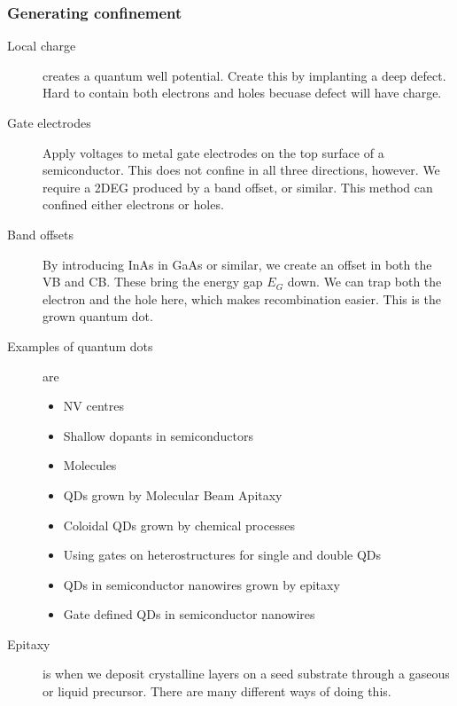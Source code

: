\subsubsection{Generating confinement}
\begin{description}
\item[Local charge] creates a quantum well potential. Create this by implanting a deep defect. Hard to contain both electrons and holes becuase defect will have charge. 

\item[Gate electrodes] Apply voltages to metal gate electrodes on the top surface of a semiconductor. This does not confine in all three directions, however. We require a 2DEG produced by a band offset, or similar. This method can confined either electrons or holes. 

\item[Band offsets] By introducing InAs in GaAs or similar, we create an offset in both the VB and CB. These bring the energy gap $E_G$ down. We can trap both the electron and the hole here, which makes recombination easier. This is the grown quantum dot. 

\item[Examples of quantum dots] are
\begin{itemize}
\item NV centres
\item Shallow dopants in semiconductors
\item Molecules
\item QDs grown by Molecular Beam Apitaxy
\item Coloidal QDs grown by chemical processes
\item Using gates on heterostructures for single and double QDs
\item QDs in semiconductor nanowires grown by epitaxy
\item Gate defined QDs in semiconductor nanowires
\end{itemize}


\item[Epitaxy] is when we deposit crystalline layers on a seed substrate through a gaseous or liquid precursor. There are many different ways of doing this. 


\end{description}
